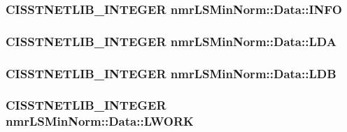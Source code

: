 \subsubsection[{I\+N\+F\+O}]{\setlength{\rightskip}{0pt plus 5cm}C\+I\+S\+S\+T\+N\+E\+T\+L\+I\+B\+\_\+\+I\+N\+T\+E\+G\+E\+R nmr\+L\+S\+Min\+Norm\+::\+Data\+::\+I\+N\+F\+O}\label{classnmr_l_s_min_norm_1_1_data_a0f96a3e574e23758c6d7e362abad201e}
\hypertarget{classnmr_l_s_min_norm_1_1_data_aa226626d2953d325f1c2738a099d5aad}{}
\subsubsection[{L\+D\+A}]{\setlength{\rightskip}{0pt plus 5cm}C\+I\+S\+S\+T\+N\+E\+T\+L\+I\+B\+\_\+\+I\+N\+T\+E\+G\+E\+R nmr\+L\+S\+Min\+Norm\+::\+Data\+::\+L\+D\+A}\label{classnmr_l_s_min_norm_1_1_data_aa226626d2953d325f1c2738a099d5aad}
\hypertarget{classnmr_l_s_min_norm_1_1_data_a9489b20db60c5e3a26941e1810cfe895}{}
\subsubsection[{L\+D\+B}]{\setlength{\rightskip}{0pt plus 5cm}C\+I\+S\+S\+T\+N\+E\+T\+L\+I\+B\+\_\+\+I\+N\+T\+E\+G\+E\+R nmr\+L\+S\+Min\+Norm\+::\+Data\+::\+L\+D\+B}\label{classnmr_l_s_min_norm_1_1_data_a9489b20db60c5e3a26941e1810cfe895}
\hypertarget{classnmr_l_s_min_norm_1_1_data_a50a5cd5f8089b150431899161b97aa2b}{}
\subsubsection[{L\+W\+O\+R\+K}]{\setlength{\rightskip}{0pt plus 5cm}C\+I\+S\+S\+T\+N\+E\+T\+L\+I\+B\+\_\+\+I\+N\+T\+E\+G\+E\+R nmr\+L\+S\+Min\+Norm\+::\+Data\+::\+L\+W\+O\+R\+K}\label{classnmr_l_s_min_norm_1_1_data_a50a5cd5f8089b150431899161b97aa2b}
\hypertarget{classnmr_l_s_min_norm_1_1_data_ac00bf9403b20ca5890370d3e788f288e}{}

